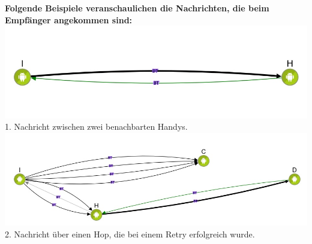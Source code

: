 \textbf{Folgende Beispiele veranschaulichen die Nachrichten, die beim
Empfänger angekommen sind:}
\includegraphics[width=1.0\textwidth]{belege/grosstests/Bilder/Test2Erfolg1.jpg} 1. Nachricht
zwischen zwei benachbarten Handys.
\includegraphics[width=1.0\textwidth]{belege/grosstests/Bilder/Test2Erfolg2.jpg} 2. Nachricht
über einen Hop, die bei einem Retry erfolgreich wurde.

